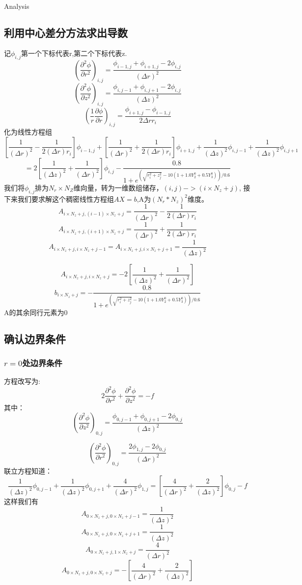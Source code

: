 \documentclass[letterpaper,12pt]{article}
\begin{document}
\begin{section}{Analysis}
    \subsection{利用中心差分方法求出导数}
        记$\phi _{i,j}$第一个下标代表r,第二个下标代表z.
        $$(\frac{\partial^2 \phi}{\partial r^2})_{i,j}=\frac{\phi_{i-1,j}+\phi_{i+1,j}-2\phi_{i,j}}{(\Delta r)^2}$$
        $$(\frac{\partial^2 \phi}{\partial z^2})_{i,j}=\frac{\phi_{i,j-1}+\phi_{i,j+1}-2\phi_{i,j}}{(\Delta z)^2}$$
        $$(\frac{1}{r}\frac{\partial \phi}{\partial r})_{i,j}=\frac{\phi_{i+1,j}-\phi_{i-1,j}}{2\Delta r r_i}$$
        化为线性方程组
        $$[\frac{1}{(\Delta r)^2}-\frac{1}{2(\Delta r) r_i}]\phi_{i-1,j}+[\frac{1}{(\Delta r)^2}+\frac{1}{2(\Delta r) r_i}]\phi_{i+1,j}+\frac{1}{(\Delta z)^2}\phi_{i,j-1}+\frac{1}{(\Delta z)^2}\phi_{i,j+1}$$
        $$= 2[\frac{1}{(\Delta z)^2}+\frac{1}{(\Delta r)^2}]\phi_{i,j}- \frac{0.8}{1+e^{(\sqrt{r_i^2+z_j^2}-10(1+1.0Y_2^0+0.5Y_3^0))/0.6}}$$
        我们将$\phi_{i,j}$排为$N_r \times N_Z$维向量，转为一维数组储存，$(i,j)->(i\times N_z+j)$, 接下来我们要求解这个稠密线性方程组$AX=b$,A为$(N_r*N_z)^2$维度。
        $$A_{i\times N_z+j,(i-1)\times N_z+j}=\frac{1}{(\Delta r)^2}-\frac{1}{2(\Delta r) r_i}$$
        $$A_{i\times N_z+j,(i+1)\times N_z+j}=\frac{1}{(\Delta r)^2}+\frac{1}{2(\Delta r) r_i}$$
        $$A_{i\times N_z+j,i\times N_z+j-1}=A_{i\times N_z+j,i\times N_z+j+1}=\frac{1}{(\Delta z)^2}$$

        $$A_{i\times N_z+j,i\times N_z+j}=-2[\frac{1}{(\Delta z)^2}+\frac{1}{(\Delta r)^2}]$$
        $$b_{i\times N_z+j}=- \frac{0.8}{1+e^{(\sqrt{r_i^2+z_j^2}-10(1+1.0Y_2^0+0.5Y_3^0))/0.6}}$$
        A的其余同行元素为0

    \subsection{确认边界条件}
        \subsubsection{$r=0$处边界条件}
            方程改写为:$$2\frac{\partial^2 \phi}{\partial r^2} + \frac{\partial^2\phi}{\partial z^2} = -f$$
            其中：
            $$(\frac{\partial^2 \phi}{\partial z^2})_{0,j}=\frac{\phi_{0,j-1}+\phi_{0,j+1}-2\phi_{0,j}}{(\Delta z)^2}$$

            $$(\frac{\partial^2 \phi}{\partial r^2})_{0,j}=\frac{2\phi_{1,j}-2\phi_{0,j}}{(\Delta r)^2}$$
            联立方程知道：
            $$\frac{1}{(\Delta z)^2}\phi_{0,j-1}+\frac{1}{(\Delta z)^2}\phi_{0,j+1}+\frac{4}{(\Delta r)^2}\phi_{1,j}=[\frac{4}{(\Delta r)^2}+\frac{2}{(\Delta z)^2}]\phi_{0,j}-f$$
            这样我们有
            $$A_{0\times N_z+j,0\times N_z+j-1}=\frac{1}{(\Delta z)^2}$$
            $$A_{0\times N_z+j,0\times N_z+j+1}=\frac{1}{(\Delta z)^2}$$
            $$A_{0\times N_z+j,1\times N_z+j}=\frac{4}{(\Delta r)^2}$$
            $$A_{0\times N_z+j,0\times N_z+j}=-[\frac{4}{(\Delta r)^2}+\frac{2}{(\Delta z)^2}]$$


\end{section}
\end{document}
